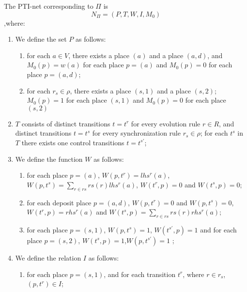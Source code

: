 \begin{definition}
The PTI-net corresponding to $\Pi$ is 
\[ N_\Pi = (P,T,W,I,M_0) \]
,where:

\begin{enumerate}
  
  \item We define the set $P$ as follows:
  \begin{enumerate}
     \item for each $a \in V$, there exists a place $(a)$ and a place $(a,d)$, and 
     $M_0(p)=w(a)$ for each place $p=(a)$ and $M_0(p)=0$ for each place $p=(a,d)$;
     \item for each $r_s \in \rho$, there exists a place $(s,1)$ and a place $(s,2)$;
     $M_0(p)=1$ for each place $(s,1)$ and $M_0(p)=0$ for each place $(s,2)$
    \end{enumerate}
    
    \item $T$ consists of distinct transitions $t=t^r$ for every evolution rule $r \in R$, and 
    distinct transitions $t=t^s$ for every synchronization rule $r_s \in \rho$;
    for each $t^s$ in $T$ there exists one control transitions $t=t^{s'}$;
    
    \item We define the function $W$ as follows:
    \begin{enumerate}
        \item for each place $p=(a)$, $W(p,t^r)=lhs^r(a)$, $W(p,t^s)=\sum_{r \in rs} rs(r)lhs^r(a)$, $W(t^r,p)=0$ and $W(t^s,p)=0$;
        \item for each deposit place $p=(a,d)$, $W(p,t^r)=0$ and $W(p,t^s)=0$, $W(t^r,p)=rhs^r(a)$ and $W(t^s,p)=\sum_{r \in rs} rs(r)rhs^r(a)$;
        \item for each place $p=(s,1)$, $W(p,t^s)=1$, $W(t^{s'},p)=1$ and for each place $p=(s,2)$, $W(t^s,p)=1$,$W(p,t^{s'})=1$ ;
    \end{enumerate}

    \item We define the relation $I$ as follows:
    \begin{enumerate}
        \item for each place $p=(s,1)$, and for each transition $t^r$, where $r \in r_s$, 
        $(p,t^r) \in I$;
    \end{enumerate}
    
\end{enumerate}
\end{definition}

